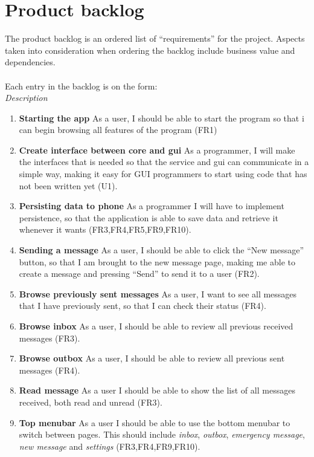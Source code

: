 \chapter{Product backlog}
The product backlog is an ordered list of ``requirements'' for the project. Aspects taken into consideration when ordering the backlog include business value and dependencies.\\\\
		Each entry in the backlog is on the form:\\
			 {\it Description}
		
		\begin{enumerate}
			\item {\bf Starting the app} As a user, I should be able to start the program so that i can begin browsing all features of the program (FR1)
			\item {\bf Create interface between core and gui} As a programmer, I will make the interfaces that is needed so that the service and gui can communicate in a simple way, making it easy for GUI programmers to start using code that has not been written yet (U1).
			\item {\bf Persisting data to phone} As a programmer I will have to implement persistence, so that the application is able to save data and retrieve it whenever it wants (FR3,FR4,FR5,FR9,FR10).
			\item {\bf Sending a message} As a user, I should be able to click the ``New message'' button, so that I am brought to the new message page, making me able to create a message and pressing ``Send'' to send it to a user (FR2).
			\item {\bf Browse previously sent messages} As a user, I want to see all messages that I have previously sent, so that I can check their status (FR4). 
			\item {\bf Browse inbox} As a user, I should be able to review all previous received messages (FR3).
			\item {\bf Browse outbox} As a user, I should be able to review all previous sent messages (FR4).
			\item {\bf{Read message}} As a user I should be able to show the list of all messages received, both read and unread (FR3).
			\item {\bf Top menubar} As a user I should be able to use the bottom menubar to switch between pages. This should include {\it inbox}, {\it outbox}, {\it emergency message}, {\it new message} and {\it settings} (FR3,FR4,FR9,FR10).

\end{enumerate}
